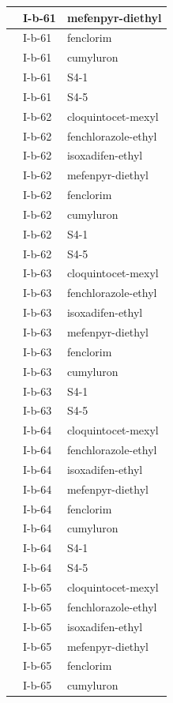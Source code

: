 \documentclass[11pt,a4paper]{article}
\begin{document}
\begin{table}[h]
\begin{tabular}{|l|l|l|}
 & I-b-61 & mefenpyr-diethyl \\ \hline
 & I-b-61 & fenclorim \\ \hline
 & I-b-61 & cumyluron \\ \hline
 & I-b-61 & S4-1 \\ \hline
 & I-b-61 & S4-5 \\ \hline
 & I-b-62 & cloquintocet-mexyl \\ \hline
 & I-b-62 & fenchlorazole-ethyl \\ \hline
 & I-b-62 & isoxadifen-ethyl \\ \hline
 & I-b-62 & mefenpyr-diethyl \\ \hline
 & I-b-62 & fenclorim \\ \hline
 & I-b-62 & cumyluron \\ \hline
 & I-b-62 & S4-1 \\ \hline
 & I-b-62 & S4-5 \\ \hline
 & I-b-63 & cloquintocet-mexyl \\ \hline
 & I-b-63 & fenchlorazole-ethyl \\ \hline
 & I-b-63 & isoxadifen-ethyl \\ \hline
 & I-b-63 & mefenpyr-diethyl \\ \hline
 & I-b-63 & fenclorim \\ \hline
 & I-b-63 & cumyluron \\ \hline
 & I-b-63 & S4-1 \\ \hline
 & I-b-63 & S4-5 \\ \hline
 & I-b-64 & cloquintocet-mexyl \\ \hline
 & I-b-64 & fenchlorazole-ethyl \\ \hline
 & I-b-64 & isoxadifen-ethyl \\ \hline
 & I-b-64 & mefenpyr-diethyl \\ \hline
 & I-b-64 & fenclorim \\ \hline
 & I-b-64 & cumyluron \\ \hline
 & I-b-64 & S4-1 \\ \hline
 & I-b-64 & S4-5 \\ \hline
 & I-b-65 & cloquintocet-mexyl \\ \hline
 & I-b-65 & fenchlorazole-ethyl \\ \hline
 & I-b-65 & isoxadifen-ethyl \\ \hline
 & I-b-65 & mefenpyr-diethyl \\ \hline
 & I-b-65 & fenclorim \\ \hline
 & I-b-65 & cumyluron \\ \hline

\end{tabular}
\end{table}
\end{document}
